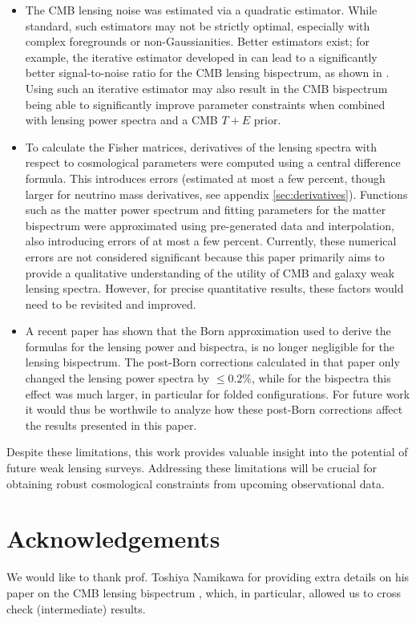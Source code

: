 \documentclass[11pt]{article} %
\begin{document}
\begin{itemize}
    \item The CMB lensing noise was estimated via a quadratic estimator. While standard, such estimators may not be strictly optimal, especially with complex foregrounds or non-Gaussianities. Better estimators exist; for example, the iterative estimator developed in \cite{Smith_2012} can lead to a significantly better signal-to-noise ratio for the CMB lensing bispectrum, as shown in \cite{Namikawa_2016}. Using such an iterative estimator may also result in the CMB bispectrum being able to significantly improve parameter constraints when combined with lensing power spectra and a CMB $T+E$ prior.
    
    \item To calculate the Fisher matrices, derivatives of the lensing spectra with respect to cosmological parameters were computed using a central difference formula.  This introduces errors (estimated at most a few percent, though larger for neutrino mass derivatives, see appendix \ref{sec:derivatives}). Functions such as the matter power spectrum and fitting parameters for the matter bispectrum were approximated using pre-generated data and interpolation, also introducing errors of at most a few percent. Currently, these numerical errors are not considered significant because this paper primarily aims to provide a qualitative understanding of the utility of CMB and galaxy weak lensing spectra.  However, for precise quantitative results, these factors would need to be revisited and improved.
    
    \item A recent paper \cite{postborn} has shown that the Born approximation used to derive the formulas for the lensing power and bispectra, is no longer negligible for the lensing bispectrum. The post-Born corrections calculated in that paper only changed the lensing power spectra by $\leq 0.2\%$, while for the bispectra this effect was much larger, in particular for folded configurations. For future work it would thus be worthwile to analyze how these post-Born corrections affect the results presented in this paper.
\end{itemize}

Despite these limitations, this work provides valuable insight into the potential of future weak lensing surveys. Addressing these limitations will be crucial for obtaining robust cosmological constraints from upcoming observational data.

\section*{Acknowledgements}
We would like to thank prof. Toshiya Namikawa for providing extra details on his paper on the CMB lensing bispectrum \cite{Namikawa_2016}, which, in particular, allowed us to cross check (intermediate) results.
\end{document}
